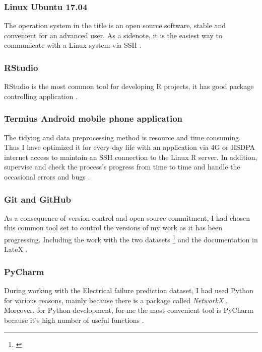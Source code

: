 			\subsubsection{Linux Ubuntu 17.04}
The operation system in the title is an open source software, stable and convenient for an advanced user. As a sidenote, it is the easiest way to communicate with a Linux system \cite{Ubuntu} via SSH \cite{SSH}.
			\subsubsection{RStudio}
RStudio is the most common tool for developing R projects, it has good package controlling application \cite{RStudio}.
			\subsubsection{Termius Android mobile phone application}
The tidying and data preprocessing method is resource and time consuming. Thus I have optimized it for every-day life with an application via 4G or HSDPA internet access to maintain an SSH connection to the Linux R server. In addition, supervise and check the process's progress from time to time and handle the occasional errors and bugs \cite{Termius}.
			\subsubsection{Git and GitHub}
As a consequence of version control and open source commitment, I had chosen this common tool set \cite{Github} to control the versions of my work as it has been progressing. Including the work with the two datasets \footnote{\cite{GitHub_CAN_RUL,GitHub_FP_RUL}} and the documentation in LateX \cite{GitHub_Thesis_Text}.
			\subsubsection{PyCharm}
During working with the Electrical failure prediction dataset, I had used Python for various reasons, mainly because there is a package called \textit{NetworkX} \cite{NetworkX}. Moreover, for Python development, for me the most convenient tool is PyCharm because it's high number of useful functions \cite{PyCharm}.	
